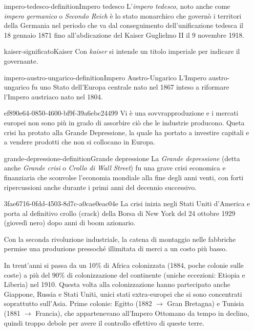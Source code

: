 \documentclass[preview]{standalone}
\begin{document}
\begin{snippetdefinition}{impero-tedesco-definition}{Impero tedesco}
    L'\textit{impero tedesco}, noto anche come \textit{impero germanico}
    o \textit{Secondo Reich} è lo stato monarchico che governò i
    territori della Germania nel periodo che va dal conseguimento
    dell'unificazione tedesca il 18 gennaio 1871 fino all'abdicazione del
    Kaiser Guglielmo II il 9 novembre 1918. 
\end{snippetdefinition}

\begin{snippetnote}{kaiser-significato}{Kaiser}
    Con \textit{kaiser} si intende un titolo imperiale per indicare il governante.
\end{snippetnote}

\begin{snippetdefinition}{impero-austro-ungarico-definition}{Impero Austro-Ungarico}
    L'Impero austro-ungarico fu uno Stato dell'Europa centrale nato nel 1867
    inteso a riformare l'Impero austriaco nato nel 1804.
\end{snippetdefinition}

\begin{snippet}{ef890e64-0850-4600-bf9f-39a6ebc24499}
    Vi è una sovvrapproduzione e i mercati europei non sono più in grado di assorbire ciò che le industrie producono.
    Queta crisi ha protato alla Grande Depressione, la quale ha portato a investire capitali 
    e a vendere prodotti che non si collocano in Europa.
\end{snippet}

\begin{snippetdefinition}{grande-depressione-definition}{Grande depressione}
    La \textit{Grande depressione} (detta anche \textit{Grande crisi} o
    \textit{Crollo di Wall Street}) fu una grave crisi economica e finanziaria che
    sconvolse l'economia mondiale alla fine degli anni venti,
    con forti ripercussioni anche durante i primi anni del decennio successivo.
\end{snippetdefinition}

\begin{snippet}{3fae6716-0fdd-4503-8d7c-a0cae0eac04e}
    La crisi inizia negli Stati Uniti d'America e porta al definitivo crollo
    (crack) della Borsa di New York del 24 ottobre 1929 (giovedì nero) dopo anni di boom azionario. 
    
    Con la seconda rivoluzione industriale, la catena di montaggio nelle fabbriche
    permise una produzione pressoché illimitata di merci a un costo più basso.
    
    In trent'anni si passa da un 10\% di Africa colonizzata (1884, poche colonie sulle coste)
    a più del 90\% di
    colonizzazione del continente (uniche eccezioni: Etiopia e Liberia) nel 1910.
    Questa volta alla colonizzazione hanno partecipato anche Giappone, Russia e Stati Uniti, unici stati
    extra-europei che si sono concentrati soprattutto sull'Asia.
    Prime colonie: Egitto (1882 \(\rightarrow\) Gran Bretagna) e Tunisia (1881 \(\rightarrow\) Francia), che appartenevano
    all'Impero Ottomano da tempo in declino, quindi troppo debole per avere il controllo effettivo di
    queste terre.
\end{snippet}
\end{document}
